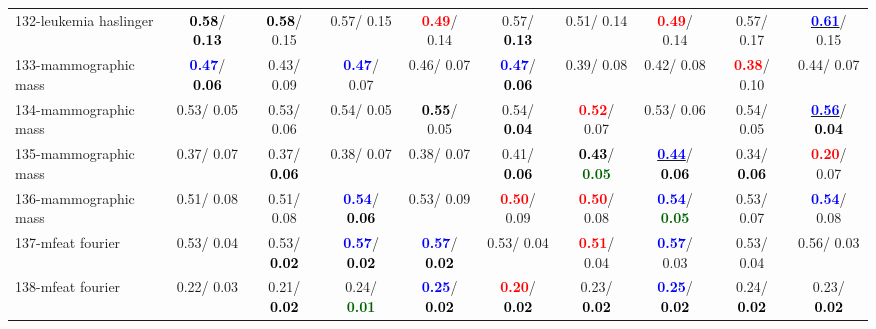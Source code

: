 \begin{table}[h]
\begin{center}
{\begin{tabular}{lc|c|c|c|c|c|c|c|c}
132-leukemia haslinger & \textcolor{black}{\textbf{  0.58}}/\textcolor{black}{\textbf{  0.13}} & \textcolor{black}{\textbf{  0.58}}/  0.15 &   0.57/  0.15 & \textcolor{red}{\textbf{  0.49}}/  0.14 &   0.57/\textcolor{black}{\textbf{  0.13}} &   0.51/  0.14 & \textcolor{red}{\textbf{  0.49}}/  0.14 &   0.57/  0.17 & \underline{\textcolor{blue}{\textbf{  0.61}}}/  0.15 \\
133-mammographic mass & \textcolor{blue}{\textbf{  0.47}}/\textcolor{black}{\textbf{  0.06}} &   0.43/  0.09 & \textcolor{blue}{\textbf{  0.47}}/  0.07 &   0.46/  0.07 & \textcolor{blue}{\textbf{  0.47}}/\textcolor{black}{\textbf{  0.06}} &   0.39/  0.08 &   0.42/  0.08 & \textcolor{red}{\textbf{  0.38}}/  0.10 &   0.44/  0.07 \\
134-mammographic mass &   0.53/  0.05 &   0.53/  0.06 &   0.54/  0.05 & \textcolor{black}{\textbf{  0.55}}/  0.05 &   0.54/\textcolor{black}{\textbf{  0.04}} & \textcolor{red}{\textbf{  0.52}}/  0.07 &   0.53/  0.06 &   0.54/  0.05 & \underline{\textcolor{blue}{\textbf{  0.56}}}/\textcolor{black}{\textbf{  0.04}} \\
135-mammographic mass &   0.37/  0.07 &   0.37/\textcolor{black}{\textbf{  0.06}} &   0.38/  0.07 &   0.38/  0.07 &   0.41/\textcolor{black}{\textbf{  0.06}} & \textcolor{black}{\textbf{  0.43}}/\textcolor{darkgreen}{\textbf{  0.05}} & \underline{\textcolor{blue}{\textbf{  0.44}}}/\textcolor{black}{\textbf{  0.06}} &   0.34/\textcolor{black}{\textbf{  0.06}} & \textcolor{red}{\textbf{  0.20}}/  0.07 \\ \hline
136-mammographic mass &   0.51/  0.08 &   0.51/  0.08 & \textcolor{blue}{\textbf{  0.54}}/\textcolor{black}{\textbf{  0.06}} &   0.53/  0.09 & \textcolor{red}{\textbf{  0.50}}/  0.09 & \textcolor{red}{\textbf{  0.50}}/  0.08 & \textcolor{blue}{\textbf{  0.54}}/\textcolor{darkgreen}{\textbf{  0.05}} &   0.53/  0.07 & \textcolor{blue}{\textbf{  0.54}}/  0.08 \\
137-mfeat fourier &   0.53/  0.04 &   0.53/\textcolor{black}{\textbf{  0.02}} & \textcolor{blue}{\textbf{  0.57}}/\textcolor{black}{\textbf{  0.02}} & \textcolor{blue}{\textbf{  0.57}}/\textcolor{black}{\textbf{  0.02}} &   0.53/  0.04 & \textcolor{red}{\textbf{  0.51}}/  0.04 & \textcolor{blue}{\textbf{  0.57}}/  0.03 &   0.53/  0.04 &   0.56/  0.03 \\
138-mfeat fourier &   0.22/  0.03 &   0.21/\textcolor{black}{\textbf{  0.02}} &   0.24/\textcolor{darkgreen}{\textbf{  0.01}} & \textcolor{blue}{\textbf{  0.25}}/\textcolor{black}{\textbf{  0.02}} & \textcolor{red}{\textbf{  0.20}}/\textcolor{black}{\textbf{  0.02}} &   0.23/\textcolor{black}{\textbf{  0.02}} & \textcolor{blue}{\textbf{  0.25}}/\textcolor{black}{\textbf{  0.02}} &   0.24/\textcolor{black}{\textbf{  0.02}} &   0.23/\textcolor{black}{\textbf{  0.02}} \\

\end{tabular}}
\end{center}
\end{table}
